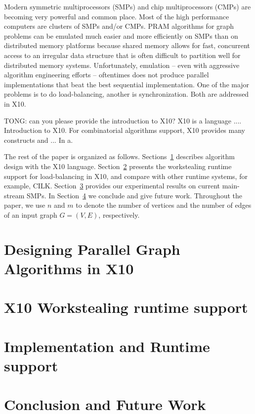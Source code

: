 \documentclass{llncs}
\begin{document}
 Modern symmetric multiprocessors (SMPs) and chip multiprocessors (CMPs) 
 are becoming very powerful and common place. Most of the high performance
 computers are clusters of SMPs and/or CMPs. PRAM algorithms for graph problems can be emulated much easier and more
 efficiently on SMPs than on distributed memory platforms because shared memory allows for fast, concurrent access
to an irregular data structure that is often difficult to partition well for distributed memory systems. 
 Unfortunately, emulation -- even with aggressive algorithm engineering efforts --
 oftentimes does not produce parallel implementations that beat the
 best sequential implementation. One of the major problems is to do load-balancing, another is synchronization. Both are addressed in X10.
 
 {TONG: can you please provide the introduction to X10}? X10 is a language .... Introduction to X10.  For combinatorial algorithms support, X10 provides many constructs and ...
 In a.   

 The rest of the paper is organized as follows. Sections~\ref{s:design} describes algorithm design with the X10 language.
 Section~\ref{s:runtime} presents the workstealing runtime support for load-balancing in X10, and compare with other runtime systems, for example, CILK. 
 Section~\ref{s:results} provides our experimental results on current main-stream SMPs.
 In Section~\ref{s:concl} we conclude and give future work. 
 Throughout the paper, we
 use $n$ and $m$ to denote the number of vertices and the number of
 edges of an input graph $G=(V,E)$, respectively. 
  

\section{Designing Parallel Graph Algorithms in X10}
\label{s:design}

\section{X10  Workstealing runtime support}
\label{s:runtime}

\section{Implementation and Runtime support }
\label{s:results}

\section{Conclusion and Future Work}
\label{s:concl}


\end{document}
